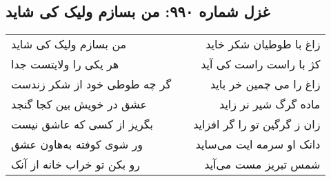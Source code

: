 \begin{center}
\section*{غزل شماره ۹۹۰: من بسازم ولیک کی شاید}
\label{sec:0990}
\begin{longtable}{l p{0.5cm} r}
من بسازم ولیک کی شاید
&&
زاغ با طوطیان شکر خاید
\\
هر یکی را ولایتست جدا
&&
کژ با راست راست کی آید
\\
گر چه طوطی خود از شکر زندست
&&
زاغ را می چمین خر باید
\\
عشق در خویش بین کجا گنجد
&&
ماده گرگ شیر نر زاید
\\
بگریز از کسی که عاشق نیست
&&
زان ز گرگین تو را گر افزاید
\\
ور شوی کوفته به‌هاون عشق
&&
دانک او سرمه ایت می‌ساید
\\
رو بکن تو خراب خانه از آنک
&&
شمس تبریز مست می‌آید
\\
\end{longtable}
\end{center}
